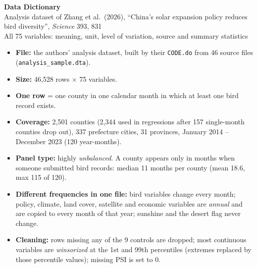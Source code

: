 \documentclass[10pt]{article}
\begin{document}
\begin{center}
{\LARGE\bfseries Data Dictionary}\\[4pt]
{\large Analysis dataset of Zhang et al.\ (2026), ``China's solar expansion policy reduces bird diversity'', \textit{Science} 393, 831}\\[4pt]
{\small All 75 variables: meaning, unit, level of variation, source and summary statistics}
\end{center}

\begin{keybox}
\small
\begin{itemize}[leftmargin=12pt]
\item \textbf{File:} the authors' analysis dataset, built by their \texttt{CODE.do} from 46 source files (\texttt{analysis\_sample.dta}).
\item \textbf{Size:} 46,528 rows $\times$ 75 variables.
\item \textbf{One row} = one county in one calendar month in which at least one bird record exists.
\item \textbf{Coverage:} 2,501 counties (2,344 used in regressions after 157 single-month counties drop out), 337 prefecture cities, 31 provinces, January 2014 -- December 2023 (120 year-months).
\item \textbf{Panel type:} highly \emph{unbalanced}. A county appears only in months when someone submitted bird records: median 11 months per county (mean 18.6, max 115 of 120).
\item \textbf{Different frequencies in one file:} bird variables change every month; policy, climate, land cover, satellite and economic variables are \emph{annual} and are copied to every month of that year; sunshine and the desert flag never change.
\item \textbf{Cleaning:} rows missing any of the 9 controls are dropped; most continuous variables are \emph{winsorized} at the 1st and 99th percentiles (extremes replaced by those percentile values); missing PSI is set to 0.
\end{itemize}
\end{keybox}
\end{document}
